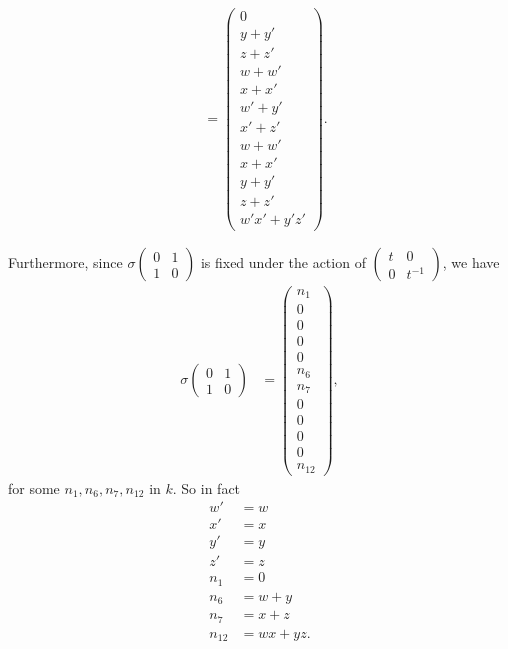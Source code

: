 \begin{align*}
&=
\left(\begin{matrix}
0 \\
y + y' \\
z + z' \\
w + w' \\
x + x' \\
w' + y' \\
x' + z' \\
w + w' \\
x + x' \\
y + y' \\
z + z' \\
w'x' + y'z'
\end{matrix}\right).
\end{align*}

Furthermore, since $\sigma\left(\begin{matrix} 0 & 1 \\ 1 & 0\end{matrix}\right)$ is fixed under the action of $\left(\begin{matrix} t & 0 \\ 0 & t^{-1}\end{matrix}\right)$, we have
\begin{align*}
\sigma\left(\begin{matrix} 0 & 1 \\ 1 & 0\end{matrix}\right) &=
\left(\begin{matrix}
n_1 \\
0 \\
0 \\
0 \\
0 \\
n_6 \\
n_7 \\
0 \\
0 \\
0 \\
0 \\
n_{12}
\end{matrix}\right),
\end{align*} 
for some $n_1, n_6, n_7, n_{12}$ in $k$. So in fact
\begin{align*}
w' &= w \\
x' &= x \\
y' &= y \\
z' &= z \\
n_1 &= 0\\
n_6 &=w+y\\
n_7 &= x+z\\
n_{12} &= wx + yz.
\end{align*}

